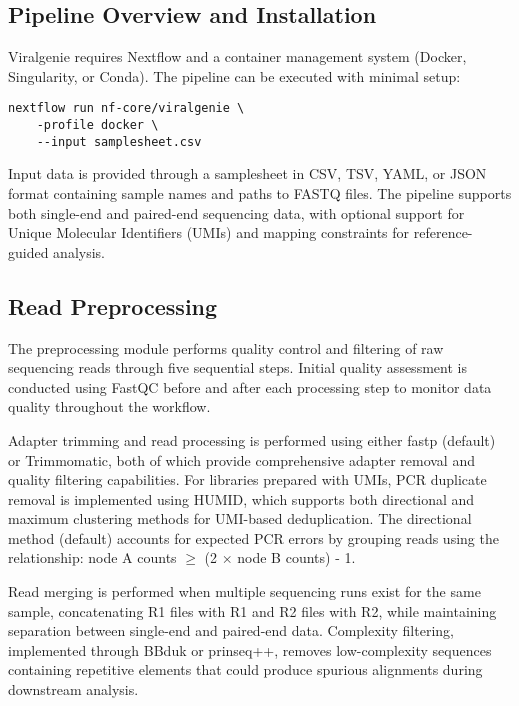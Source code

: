\documentclass[unnumsec,webpdf,contemporary,large]{oup-authoring-template}%
\theoremstyle{thmstyleone}%
\theoremstyle{thmstyletwo}%
\theoremstyle{thmstylethree}%
\begin{document}
\subsection{Pipeline Overview and Installation}\label{subsec_overview}

Viralgenie requires Nextflow and a container management system (Docker, Singularity, or Conda). The pipeline can be executed with minimal setup:

\begin{verbatim}
nextflow run nf-core/viralgenie \
    -profile docker \
    --input samplesheet.csv
\end{verbatim}

Input data is provided through a samplesheet in CSV, TSV, YAML, or JSON format containing sample names and paths to FASTQ files. The pipeline supports both single-end and paired-end sequencing data, with optional support for Unique Molecular Identifiers (UMIs) and mapping constraints for reference-guided analysis.

\subsection{Read Preprocessing}\label{subsec_preprocessing}

The preprocessing module performs quality control and filtering of raw sequencing reads through five sequential steps. Initial quality assessment is conducted using FastQC before and after each processing step to monitor data quality throughout the workflow.

Adapter trimming and read processing is performed using either fastp (default) or Trimmomatic, both of which provide comprehensive adapter removal and quality filtering capabilities. For libraries prepared with UMIs, PCR duplicate removal is implemented using HUMID, which supports both directional and maximum clustering methods for UMI-based deduplication. The directional method (default) accounts for expected PCR errors by grouping reads using the relationship: node A counts $\geq$ (2 $\times$ node B counts) - 1.

Read merging is performed when multiple sequencing runs exist for the same sample, concatenating R1 files with R1 and R2 files with R2, while maintaining separation between single-end and paired-end data. Complexity filtering, implemented through BBduk or prinseq++, removes low-complexity sequences containing repetitive elements that could produce spurious alignments during downstream analysis.
\end{document}
